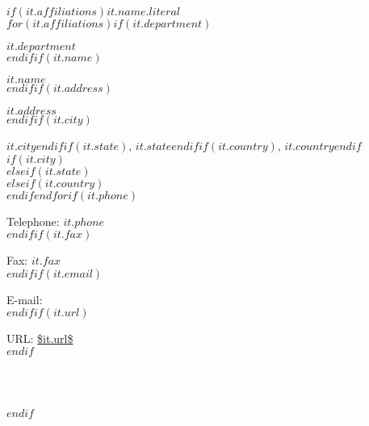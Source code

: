 $if(it.affiliations)$$it.name.literal$\\$for(it.affiliations)$$if(it.department)$

$it.department$\\$endif$$if(it.name)$

$it.name$\\$endif$$if(it.address)$

$it.address$\\$endif$$if(it.city)$

$it.city$$endif$$if(it.state)$, $it.state$$endif$$if(it.country)$, $it.country$$endif$$if(it.city)$\\$elseif(it.state)$\\$elseif(it.country)$\\$endif$$endfor$$if(it.phone)$

Telephone: $it.phone$\\$endif$$if(it.fax)$

Fax: $it.fax$\\$endif$$if(it.email)$

E-mail: \\$endif$$if(it.url)$

URL: \url{$it.url$}\\$endif$

\\~

$endif$
